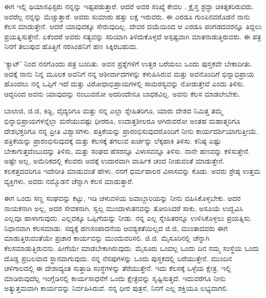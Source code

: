 ಈಗ ಇಲ್ಲಿ ಥಿಯಾಸಫಿಸ್ಟರು ನನ್ನನ್ನು ಇಷ್ಟಪಡುತ್ತಾರೆ. ಆದರೆ ಅವರ ಸಂಖ್ಯೆ ಕೇವಲ . ಕ್ರೈಸ್ತ ಶ್ರದ್ಧಾ ಚಿಕಿತ್ಸಕರಿರುವರು. ಅವರೆಲ್ಲ ನನ್ನನ್ನು ಮೆಚ್ಚುತ್ತಾರೆ. ಅವರು ಸುಮಾರು ಹತ್ತು ಲಕ್ಷ ಇರುವರು. ಈ ಎರಡೂ ಗುಂಪಿನವರೊಡನೆ ನಾನು ಕೆಲಸ ಮಾಡುತ್ತೇನೆ. ಆದರೆ ಯಾವುದಕ್ಕೂ ಸೇರುವುದಿಲ್ಲ. ದೇವರ ದಯೆಯಿಂದ ಆ ಎರಡೂ ಪಂಗಡದವರನ್ನೂ ತಿದ್ದಲು ಪ್ರಯತ್ನಿಸುತ್ತೇನೆ. ಏಕೆಂದರೆ ಅವರು ಸತ್ಯವನ್ನು ಸರಿಯಾಗಿ ತಿಳಿದುಕೊಳ್ಳದೆ ಅಸ್ಪಷ್ಟವಾಗಿ ಮಾತನಾಡುತ್ತಿರುವರು. ಈ ಪತ್ರ ನಿನಗೆ ತಲುಪುವ ಹೊತ್ತಿಗೆ ನರಸಿಂಹನಿಗೆ ಹಣ ಸಿಕ್ಕಿರಬಹುದು.

‘ಕ್ಯಾಟ್’ ನಿಂದ ನನಗೊಂದು ಪತ್ರ ಬಂದಿತು. ಅವನ ಪ್ರಶ್ನೆಗಳಿಗೆ ಉತ್ತರ ಬರೆಯಲು ಒಂದು ಪುಸ್ತಕವೇ ಬೇಕಾದೀತು. ಅದಕ್ಕೆ ನಾನು ನಿನ್ನ ಮೂಲಕ ಅವನಿಗೆ ನನ್ನ ಆಶೀರ್ವಾದಗಳನ್ನು ಕಳುಹಿಸಿರುವ ಮತ್ತು ಅವನೊಂದಿಗೆ ಭಿನ್ನಾಭಿಪ್ರಾಯ ಹೊಂದಲು ನನ್ನ ಒಪ್ಪಿಗೆ ಇದೆ ಮತ್ತು ವಿರೋಧಾಭಿಪ್ರಾಯಗಳಲ್ಲಿ ಸಾಮರಸ್ಯವನ್ನು ನೋಡುತ್ತೇವೆ ಎಂದು ತಿಳಿಸು. ಆದ್ದರಿಂದ ಅವನು ಯಾವುದನ್ನು ನಂಬುವನೋ ಅದರಿಂದೇನೂ ಬಾಧಕವಿಲ್ಲ. ಅವನು ಕೆಲಸ ಮಾಡಲೇಬೇಕು.

ಬಾಲಾಜಿ, ಜಿ.ಜಿ, ಕಿಡ್ಡಿ, ವೈದ್ಯರಿಗೂ ಮತ್ತು ನನ್ನ ಎಲ್ಲಾ ಸ್ನೇಹಿತರಿಗೂ, ಯಾರು ದೇಶದ ನಿಮಿತ್ತ ತಮ್ಮ ಭಿನ್ನಾಭಿಪ್ರಾಯಗಳನ್ನೆಲ್ಲಾ ಮರೆಯುವಷ್ಟು ಧೀರರೂ, ಉದಾತ್ತಶೀಲರೂ ಆಗಿರುವರೋ ಅಂತಹ ಮಹಾತ್ಮರಿಗೂ ದೇಶಭಕ್ತರಿಗೂ ನನ್ನ ಪ್ರೀತಿ ವಿಶ್ವಾಸಗಳು. ಪತ್ರಿಕೆಯನ್ನು ಪ್ರಾರಂಭಿಸುವುದರೊಂದಿಗೆ ನೀನು ಕಾರ್ಯದರ್ಶಿಯಾಗುತ್ತೀಯೆ. ಪತ್ರಿಕೆಯನ್ನು ಪ್ರಾರಂಭಿಸುವುದಕ್ಕೆ ಮತ್ತು ಕೆಲಸಕ್ಕೆ ತಗಲುವ ಖರ್ಚನ್ನು ಲೆಕ್ಕಹಾಕಿ ತಿಳಿಸು. ಕನಿಷ್ಠ ಎಷ್ಟು ಬೇಕಾಗುತ್ತದೆಂಬುದನ್ನು ತಿಳಿಸು, ಮತ್ತು ಸಂಘದ ಹೆಸರನ್ನೂ ವಿಳಾಸವನ್ನೂ ತಿಳಿಸು. ನಾನೇ ಹಣವನ್ನು ಕಳಿಸುತ್ತೇನೆ. ಅಷ್ಟೇ ಅಲ್ಲ, ಅಮೆರಿಕದಲ್ಲಿ ಕೆಲವರು ಅದಕ್ಕೆ ಉದಾರವಾಗಿ ವಾರ್ಷಿಕ ಚಂದ ನೀಡುವಂತೆ ಮಾಡುತ್ತೇನೆ. ಕಲಕತ್ತದವರಿಗೂ ಇದೇರೀತಿ ಮಾಡುವಂತೆ ಹೇಳು. ನನಗೆ ಧರ್ಮಪಾಲರ ವಿಳಾಸವನ್ನು ಕೊಡು. ಅವರು ಶ್ರೇಷ್ಠ ಉತ್ತಮ ವ್ಯಕ್ತಿಗಳು. ಅವರು ನಮ್ಮೊಡನೆ ಚೆನ್ನಾಗಿ ಕೆಲಸ ಮಾಡುತ್ತಾರೆ.

\vspace{0.2cm}

ಈಗ ಒಂದು ಸಣ್ಣ ಸಂಘವನ್ನು ಕಟ್ಟು, ಇಡಿ ಚಳುವಳಿಯ ಜವಾಬ್ದಾರಿಯನ್ನು ನೀನು ವಹಿಸಿಕೊಳ್ಳಬೇಕು. ಅದರ ನಾಯಕನಾಗಿ ಅಲ್ಲ, ಅದರ ಸೇವಕನಾಗಿ. ಸ್ವಲ್ಪ ಮುಂದಾಳುತನವನ್ನು ತೋರಿಸಿದರೆ ಸಾಕು, ಅಸೂಯೆ ಉದ್ಭವಿಸಿ ಎಲ್ಲವೂ ಹಾಳಾಗುವುದು. ಎಲ್ಲದಕ್ಕೂ ಒಪ್ಪಿಗೆಯನ್ನು ನೀಡು. ನನ್ನ ಎಲ್ಲ ಸ್ನೇಹಿತರನ್ನೂ ಉಳಿಸಿಕೊಳ್ಳಲು ಪ್ರಯತ್ನಿಸು. ನಿಧಾನವಾಗಿ ಕೆಲಸಮಾಡು. ಸದ್ಯಕ್ಕೆ ಹಣಸಂಪಾದನೆಯ ಆವಶ್ಯಕತೆಯಿಲ್ಲದ ಜಿ.ಜಿ, ಮುಂತಾದವರು ಈಗ ಮಾಡುತ್ತಿರುವಂತೆಯೇ ಪ್ರಚಾರ ಕಾರ್ಯವನ್ನು ಮುಂದುವರಿಸಲಿ. ಜಿ.ಜಿ. ಮೈಸೂರಿನಲ್ಲಿ ಚೆನ್ನಾಗಿ ಕೆಲಸಮಾಡುತ್ತಿರುವನು. ಹೀಗೆಯೇ ಮಾಡಬೇಕಾಗಿರುವುದು. ಮೈಸೂರು ಒಂದಲ್ಲ ಒಂದು ದಿನ ನಮ್ಮ ಸಂಸ್ಥೆಯ ಒಂದು ದೊಡ್ಡ ಪ್ರಬಲವಾದ ಸ್ಥಾನವಾಗುವುದು. ನನ್ನ ನೆನಪುಗಳನ್ನು ಒಂದು ಪುಸ್ತಕದಲ್ಲಿ ಬರೆಯುತ್ತೇನೆ. ಮುಂದಿನ ಚಳಿಗಾಲದಲ್ಲಿ ಈ ದೇಶಾದ್ಯಂತ ಸುತ್ತಾಡಿ ಸಂಸ್ಥೆಗಳನ್ನು ತೆರೆಯುತ್ತೇನೆ. ಇದು ಕೆಲಸಕ್ಕೆ ಒಳ್ಳೆಯ ಕ್ಷೇತ್ರ. ಇಲ್ಲಿ ಮಾಡಿರುವುದೆಲ್ಲ ಇಂಗ್ಲೆಡಿನಲ್ಲಿ ಕಾರ್ಯಸಾಧನೆಗೆ ಒಂದು ಕ್ಷೇತ್ರವನ್ನು ಸೃಷ್ಟಿಸುತ್ತದೆ. ಇದುವರೆಗೂ ನೀನು ಅತ್ಯುತ್ತಮವಾಗಿ ಕಾರ್ಯವನ್ನು ನಿರ್ವಹಿಸಿರುವೆ. ನನ್ನ ಧೀರ ಪುತ್ರನೆ, ನಿನಗೆ ಎಲ್ಲ ಶಕ್ತಿಯೂ ಲಭ್ಯವಾಗಲಿ.

\vspace{0.2cm}

